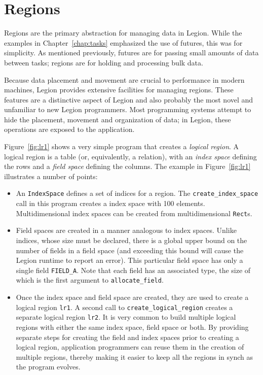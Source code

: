 \chapter{Regions}
\label{chap:regions}

Regions are the primary abstraction for managing data in Legion.  While the
examples in Chapter~\ref{chap:tasks} emphasized the use of futures, this was for
simplicity.  As mentioned previously, futures are for passing small amounts of data
between tasks; regions are for holding and processing bulk data.

Because data placement and movement are crucial to performance in modern machines,
Legion provides extensive facilities for managing regions.  These features are a
distinctive aspect of Legion and also probably the most novel and unfamiliar 
to new Legion programmers.  Most programming systems attempt to hide the placement,
movement and organization of data; in Legion, these operations are exposed to
the application.

Figure~\ref{fig:lr1} shows a very simple program that
creates a {\em logical region}.  A logical region is a table (or,
equivalently, a relation), with an {\em index space} defining the rows
and a {\em field space} defining the columns. The example
in Figure~\ref{fig:lr1} illustrates a number of points:

\begin{itemize}

\item An {\tt IndexSpace} defines a set of indices for a region.  The {\tt create\_index\_space}
call in this program creates a index space with 100 elements.  Multidimensional index spaces can be
created from multidimensional {\tt Rect}s.

\item Field spaces are created in a manner analogous to index spaces.
  Unlike indices, whose size must be declared, there is a global upper
  bound on the number of fields in a field space (and exceeding this bound will cause
  the Legion runtime to report an error).  This particular
  field space has only a single field {\tt FIELD\_A}.  Note that each field has an associated type, the
  size of which is the first argument to {\tt allocate\_field}.

\item Once the index space and field space are created, they are used to create
a logical region {\tt lr1}.  A second call to {\tt create\_logical\_region}
creates a separate logical region {\tt lr2}.  It is very common to build
multiple logical regions with either the same index space, field space or both.
By providing separate steps for creating the field and index spaces prior to creating
a logical region, application programmers can reuse them in the creation of multiple
regions, thereby making it easier to keep all the regions in synch as the program 
evolves.
\end{itemize}

